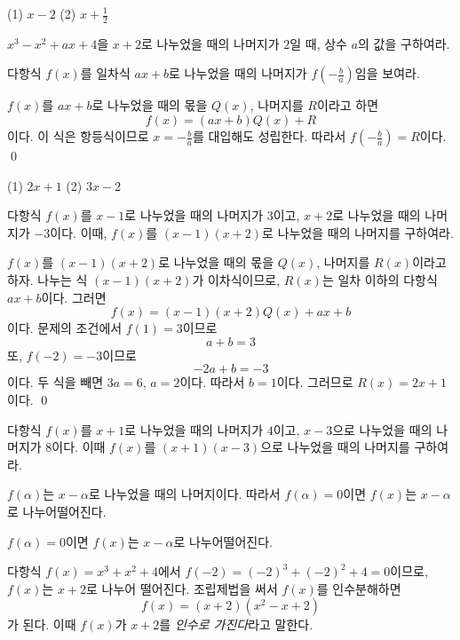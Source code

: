 \documentclass{oblivoir}
\begin{document}
%
\par\noindent
(1) \(x-2\)
(2) \(x+\frac12\)

%
\prob{}
\(x^3-x^2+ax+4\)을 \(x+2\)로 나누었을 때의 나머지가 \(2\)일 때, 상수 \(a\)의 값을 구하여라.

%
\exam{}
다항식 \(f(x)\)를 일차식 \(ax+b\)로 나누었을 때의 나머지가 \(f\left(-\frac ba\right)\)임을 보여라.
\begin{mdframed}
\(f(x)\)를 \(ax+b\)로 나누었을 때의 몫을 \(Q(x)\), 나머지를 \(R\)이라고 하면
\[f(x)=(ax+b)Q(x)+R\]
이다.
이 식은 항등식이므로 \(x=-\frac ba\)를 대입해도 성립한다.
따라서 \(f\left(-\frac ba\right)=R\)이다.
\qed
\end{mdframed}

%
\par\noindent
(1) \(2x+1\)
(2) \(3x-2\)

\clearpage
%
\exam{}
다항식 \(f(x)\)를 \(x-1\)로 나누었을 때의 나머지가 \(3\)이고, \(x+2\)로 나누었을 때의 나머지가 \(-3\)이다.
이때, \(f(x)\)를 \((x-1)(x+2)\)로 나누었을 때의 나머지를 구하여라.
\begin{mdframed}
\(f(x)\)를 \((x-1)(x+2)\)로 나누었을 때의 몫을 \(Q(x)\), 나머지를 \(R(x)\)이라고 하자.
나누는 식 \((x-1)(x+2)\)가 이차식이므로, \(R(x)\)는 일차 이하의 다항식 \(ax+b\)이다.
그러면
\[f(x)=(x-1)(x+2)Q(x)+ax+b\]
이다.
문제의 조건에서 \(f(1)=3\)이므로
\[a+b=3\]
또, \(f(-2)=-3\)이므로
\[-2a+b=-3\]
이다.
두 식을 빼면 \(3a=6\), \(a=2\)이다.
따라서 \(b=1\)이다.
그러므로 \(R(x)=2x+1\)이다.
\qed
\end{mdframed}

%
\prob{}
다항식 \(f(x)\)를 \(x+1\)로 나누었을 때의 나머지가 \(4\)이고, \(x-3\)으로 나누었을 때의 나머지가 \(8\)이다.
이때 \(f(x)\)를 \((x+1)(x-3)\)으로 나누었을 때의 나머지를 구하여라.

\clearpage
\(f(\alpha)\)는 \(x-\alpha\)로 나누었을 때의 나머지이다.
따라서 \(f(\alpha)=0\)이면 \(f(x)\)는 \(x-\alpha\)로 나누어떨어진다.
\begin{mdframed}
%
\(f(\alpha)=0\)이면 \(f(x)\)는 \(x-\alpha\)로 나누어떨어진다.
\end{mdframed}

%
\exam{}
다항식 \(f(x)=x^3+x^2+4\)에서 \(f(-2)=(-2)^3+(-2)^2+4=0\)이므로, \(f(x)\)는 \(x+2\)로 나누어 떨어진다.
조립제법을 써서 \(f(x)\)를 인수분해하면
\[f(x)=(x+2)(x^2-x+2)\]
가 된다.
이때 \(f(x)\)가 \(x+2\)를 \emph{인수로 가진다}라고 말한다.
\end{document}
